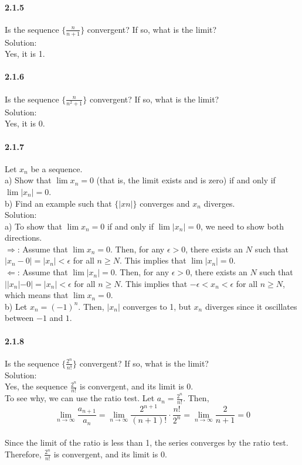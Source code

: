 \documentclass{article}
\begin{document}
\paragraph{2.1.5}
Is the sequence $\{\frac{n}{n+1}\}$ convergent? If so, what is the limit?\\
Solution:\\
Yes, it is 1.
\paragraph{2.1.6}
Is the sequence $\{\frac{n}{n^2+1}\}$ convergent? If so, what is the limit?\\
Solution:\\
Yes, it is 0.
\paragraph{2.1.7}
Let ${x_n}$ be a sequence.\\
a) Show that $\lim x_n = 0$ (that is, the limit exists and is zero) if and only if $\lim|x_n|=0$.\\
b) Find an example such that $\{|xn|\}$ converges and ${x_n}$ diverges.\\
Solution:\\
a) To show that $\lim x_n = 0$ if and only if $\lim |x_n| = 0$, we need to show both directions.\\
$\Rightarrow$: Assume that $\lim x_n = 0$. Then, for any $\epsilon > 0$, there exists an $N$ such that $|x_n - 0| = |x_n| < \epsilon$ for all $n \geq N$. This implies that $\lim |x_n| = 0$.\\
$\Leftarrow$: Assume that $\lim |x_n| = 0$. Then, for any $\epsilon > 0$, there exists an $N$ such that $||x_n| - 0| = |x_n| < \epsilon$ for all $n \geq N$. This implies that $-\epsilon < x_n < \epsilon$ for all $n \geq N$, which means that $\lim x_n = 0$.\\
b) Let $x_n = (-1)^n$. Then, ${|x_n|}$ converges to 1, but ${x_n}$ diverges since it oscillates between $-1$ and $1$.
\paragraph{2.1.8}
Is the sequence $\{\frac{2^n}{n!}\}$ convergent? If so, what is the limit?\\
Solution:\\
Yes, the sequence ${\frac{2^n}{n!}}$ is convergent, and its limit is 0.\\
To see why, we can use the ratio test. Let $a_n = \frac{2^n}{n!}$. Then,\\
$$\lim_{n \to \infty} \frac{a_{n+1}}{a_n} = \lim_{n \to \infty} \frac{2^{n+1}}{(n+1)!} \cdot \frac{n!}{2^n} = \lim_{n \to \infty} \frac{2}{n+1} = 0$$\\
Since the limit of the ratio is less than 1, the series converges by the ratio test. Therefore, ${\frac{2^n}{n!}}$ is convergent, and its limit is 0.
\end{document}
